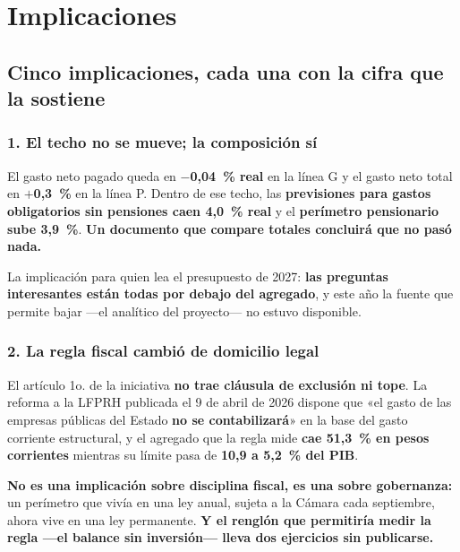 \chapter{Implicaciones}


\section{Cinco implicaciones, cada una con la cifra que la sostiene}

\subsection*{1. El techo no se mueve; la composición sí}

El gasto neto pagado queda en \textbf{$-$0,04~\% real} en la línea G y el gasto neto total en
\textbf{$+$0,3~\%} en la línea P. Dentro de ese techo, las \textbf{previsiones para gastos
obligatorios sin pensiones caen 4,0~\% real} y el \textbf{perímetro pensionario sube
3,9~\%}. \textbf{Un documento que compare totales concluirá que no pasó nada.}

La implicación para quien lea el presupuesto de 2027: \textbf{las preguntas interesantes están
todas por debajo del agregado}, y este año la fuente que permite bajar ---el analítico del
proyecto--- no estuvo disponible.

\subsection*{2. La regla fiscal cambió de domicilio legal}

El artículo 1o. de la iniciativa \textbf{no trae cláusula de exclusión ni tope}. La
reforma a la LFPRH publicada el 9 de abril de 2026 dispone que «el gasto de las empresas
públicas del Estado \textbf{no se contabilizará}» en la base del gasto corriente estructural,
y el agregado que la regla mide \textbf{cae 51,3~\% en pesos corrientes} mientras su límite
pasa de \textbf{10,9 a 5,2~\% del PIB}.

\textbf{No es una implicación sobre disciplina fiscal, es una sobre gobernanza:} un perímetro
que vivía en una ley anual, sujeta a la Cámara cada septiembre, ahora vive en una ley
permanente. \textbf{Y el renglón que permitiría medir la regla ---el balance sin
inversión--- lleva dos ejercicios sin publicarse.}

